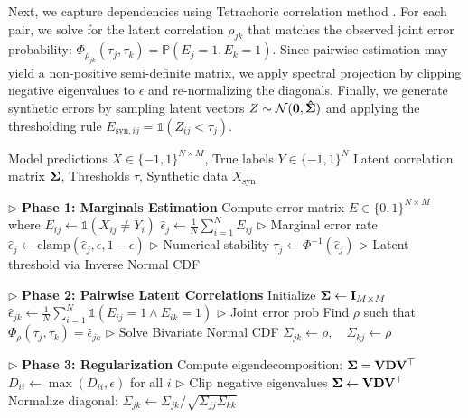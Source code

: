 \documentclass{article}
\theoremstyle{plain}
\theoremstyle{definition}
\theoremstyle{remark}
\begin{document}
Next, we capture dependencies using Tetrachoric correlation method \citep{tetra}. For each pair, we solve for the latent correlation $\rho_{jk}$ that matches the observed joint error probability: $\Phi_{\rho_{jk}}(\tau_j, \tau_k) = \mathbb{P}(E_j=1, E_k=1)$. Since pairwise estimation may yield a non-positive semi-definite matrix, we apply spectral projection by clipping negative eigenvalues to $\epsilon$ and re-normalizing the diagonals. Finally, we generate synthetic errors by sampling latent vectors $Z \sim \mathcal{N}(\mathbf{0}, {\bf\hat{\Sigma}})$ and applying the thresholding rule $E_{\text{syn}, ij} = \mathds{1}(Z_{ij} < \tau_j)$.

\begin{algorithm}[ht]
\caption{Gaussian-Copula Fitting and Synthetic Generation}
\label{alg:copula}
\begin{algorithmic}[1]
\REQUIRE Model predictions $X \in \{-1, 1\}^{N \times M}$, True labels $Y \in \{-1, 1\}^N$
\ENSURE Latent correlation matrix ${\bf \Sigma }$, Thresholds $\tau$, Synthetic data $X_{\text{syn}}$

\STATE \hfill $\triangleright$ \textbf{Phase 1: Marginals Estimation}
\STATE Compute error matrix $E \in \{0, 1\}^{N \times M}$ where $E_{ij} \leftarrow \mathds{1}(X_{ij} \neq Y_i)$
    \STATE $\hat{\epsilon}_j \leftarrow \frac{1}{N} \sum_{i=1}^N E_{ij}$ \hfill $\triangleright$ Marginal error rate
    \STATE $\hat{\epsilon}_j \leftarrow \text{clamp}(\hat{\epsilon}_j, \epsilon, 1-\epsilon)$ \hfill $\triangleright$ Numerical stability
    \STATE $\tau_j \leftarrow \Phi^{-1}(\hat{\epsilon}_j)$ \hfill $\triangleright$ Latent threshold via Inverse Normal CDF
\ENDFOR

\STATE
\STATE \hfill $\triangleright$ \textbf{Phase 2: Pairwise Latent Correlations}
\STATE Initialize ${\bf \Sigma } \leftarrow {\bf I}_{M \times M}$
        \STATE $\hat{\epsilon}_{jk} \leftarrow \frac{1}{N} \sum_{i=1}^N \mathds{1}(E_{ij}=1 \land E_{ik}=1)$ \hfill $\triangleright$ Joint error prob
        \STATE Find $\rho$ such that $\Phi_{\rho}(\tau_j, \tau_k) = \hat{\epsilon}_{jk}$ \hfill $\triangleright$ Solve Bivariate Normal CDF
        \STATE $\Sigma_{jk} \leftarrow \rho, \quad \Sigma_{kj} \leftarrow \rho$
    \ENDFOR
\ENDFOR

\STATE
\STATE \hfill $\triangleright$ \textbf{Phase 3: Regularization}
\STATE Compute eigendecomposition: ${\bf \Sigma} = {\bf V D V^\top}$
\STATE $D_{ii} \leftarrow \max(D_{ii}, \epsilon)$ for all $i$ \hfill $\triangleright$ Clip negative eigenvalues
\STATE ${\bf \Sigma \leftarrow V D V^\top}$
\STATE Normalize diagonal: $\Sigma_{jk} \leftarrow \Sigma_{jk} / \sqrt{\Sigma_{jj} \Sigma_{kk}}$


\end{algorithmic}
\end{algorithm}
\end{document}
